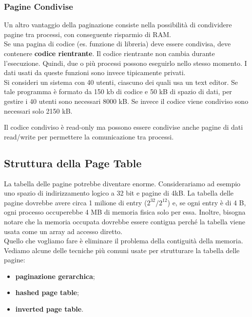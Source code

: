 \documentclass{article}
\begin{document}
			\subsubsection{Pagine Condivise}
				Un altro vantaggio della paginazione consiste nella possibilità di condividere pagine  tra processi, con conseguente risparmio di RAM.
				\\Se una pagina di codice (es. funzione di libreria) deve essere condivisa, deve contenere \textbf{codice rientrante}. Il codice rientrante non cambia durante l’esecuzione. Quindi, due o più processi possono eseguirlo nello stesso momento. I dati usati da queste funzioni sono invece tipicamente privati.
				\\Si consideri un sistema con 40 utenti, ciascuno dei quali usa un text editor. Se tale programma è formato da 150 kb di codice e 50 kB di spazio di dati, per gestire i 40 utenti sono necessari 8000 kB. Se invece il codice viene condiviso sono necessari solo 2150 kB.
				\newpage
				\begin{figure}[ht!]
				\end{figure}
				\noindent Il codice condiviso è read-only ma possono essere condivise anche pagine di dati read/write per permettere la comunicazione tra processi.

		\subsection{Struttura della Page Table}
			La tabella delle pagine potrebbe diventare enorme. Considerariamo ad esempio uno spazio di indirizzamento logico a 32 bit e pagine di 4kB. La tabella delle pagine dovrebbe avere circa 1 milione di entry ($2^{32}/2^{12}$) e, se ogni entry è di 4 B, ogni processo occuperebbe 4 MB di memoria fisica solo per essa. Inoltre, bisogna notare che la memoria occupata dovrebbe essere contigua perché la tabella viene usata come un array ad accesso diretto.
			\\Quello che vogliamo fare è  eliminare il problema della contiguità della memoria. Vediamo alcune delle tecniche più comuni usate per strutturare la tabella delle pagine:
			\begin{itemize}
				\item \textbf{paginazione gerarchica};
				\item \textbf{hashed page table};
				\item \textbf{inverted page table}.
			\end{itemize}
\end{document}
